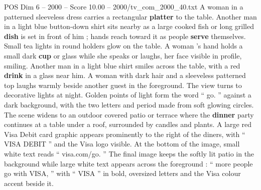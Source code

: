 \begin{textsample}{POS Dim 6 – 2000 – Score 10.00 – 2000/tv\_com\_2000\_40.txt}
A woman in a patterned sleeveless dress carries a rectangular \textbf{platter} to the table.
Another man in a light blue button-down shirt sits nearby as a large cooked fish or long grilled \textbf{dish} is set in front of him ; hands reach toward it as people \textbf{serve} themselves.
Small tea lights in round holders glow on the table.
A woman ’s hand holds a small dark \textbf{cup} or glass while she speaks or laughs, her face visible in profile, smiling.
Another man in a light blue shirt smiles across the table, with a red \textbf{drink} in a glass near him.
A woman with dark hair and a sleeveless patterned top laughs warmly beside another guest in the foreground.
The view turns to decorative lights at night.
Golden points of light form the word “ go. ” against a dark background, with the two letters and period made from soft glowing circles.
The scene widens to an outdoor covered patio or terrace where the \textbf{dinner} party continues at a table under a roof, surrounded by candles and plants.
A large red Visa Debit card graphic appears prominently to the right of the diners, with “ VISA DEBIT ” and the Visa logo visible.
At the bottom of the image, small white text reads “ visa.com/go. ” The final image keeps the softly lit patio in the background while large white text appears across the foreground : “ more people go with VISA, ” with “ VISA ” in bold, oversized letters and the Visa colour accent beside it.

\end{textsample}
